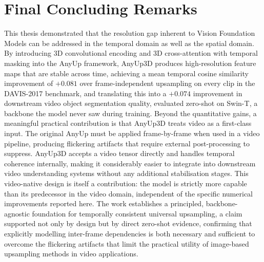 \section{Final Concluding Remarks}
\label{sec:closing}

This thesis demonstrated that the resolution gap inherent to Vision Foundation Models can be addressed in the temporal domain as well as the spatial domain.
By introducing 3D convolutional encoding and 3D cross-attention with temporal masking into the AnyUp framework, AnyUp3D produces high-resolution feature maps that are stable across time, achieving a mean temporal cosine similarity improvement of $+0.081$ over frame-independent upsampling on every clip in the DAVIS-2017 benchmark, and translating this into a $+0.074$ improvement in downstream video object segmentation quality, evaluated zero-shot on Swin-T, a backbone the model never saw during training.
Beyond the quantitative gains, a meaningful practical contribution is that AnyUp3D treats video as a first-class input.
The original AnyUp must be applied frame-by-frame when used in a video pipeline, producing flickering artifacts that require external post-processing to suppress.
AnyUp3D accepts a video tensor directly and handles temporal coherence internally, making it considerably easier to integrate into downstream video understanding systems without any additional stabilisation stages.
This video-native design is itself a contribution: the model is strictly more capable than its predecessor in the video domain, independent of the specific numerical improvements reported here.
The work establishes a principled, backbone-agnostic foundation for temporally consistent universal upsampling, a claim supported not only by design but by direct zero-shot evidence, confirming that explicitly modelling inter-frame dependencies is both necessary and sufficient to overcome the flickering artifacts that limit the practical utility of image-based upsampling methods in video applications.